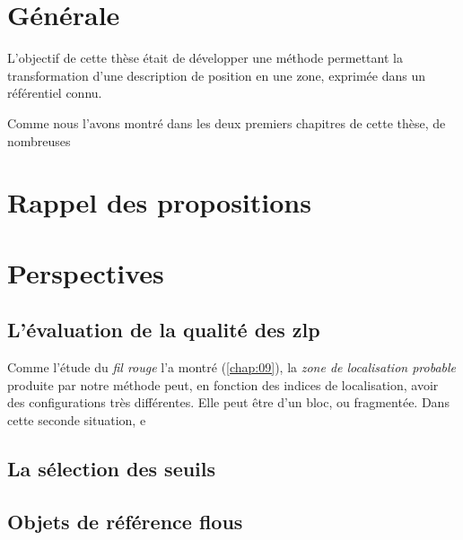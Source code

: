 \section{Générale}

L'objectif de cette thèse était de développer une méthode permettant
la transformation d'une description de position en une zone, exprimée
dans un référentiel connu.


Comme nous l'avons montré dans les deux premiers chapitres de cette
thèse, de nombreuses



\section{Rappel des propositions}

\section{Perspectives}



\subsection{L'évaluation de la qualité des \ac{zlp}}

Comme l'étude du \emph{fil rouge} l'a montré (\autoref{chap:09}), la
\emph{zone de localisation probable} produite par notre méthode peut,
en fonction des indices de localisation, avoir des configurations très
différentes. Elle peut être d'un bloc, ou fragmentée. Dans cette
seconde situation,  e

\subsection{La sélection des seuils}

\subsection{Objets de référence flous}


